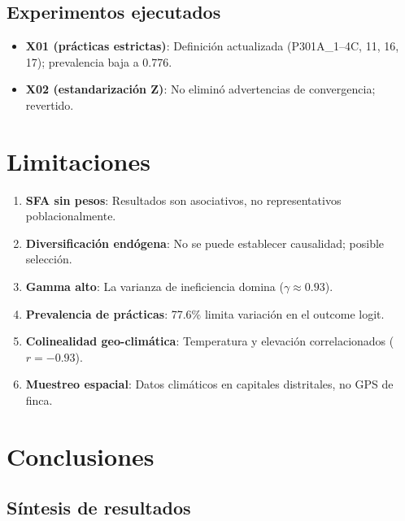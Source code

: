 \documentclass[11pt,a4paper]{article}
\begin{document}
\subsection{Experimentos ejecutados}
\begin{itemize}
    \item \textbf{X01 (prácticas estrictas)}: Definición actualizada (P301A\_1--4C, 11, 16, 17); prevalencia baja a 0.776.
    \item \textbf{X02 (estandarización Z)}: No eliminó advertencias de convergencia; revertido.
\end{itemize}

\section{Limitaciones}

\begin{enumerate}
    \item \textbf{SFA sin pesos}: Resultados son asociativos, no representativos poblacionalmente.
    \item \textbf{Diversificación endógena}: No se puede establecer causalidad; posible selección.
    \item \textbf{Gamma alto}: La varianza de ineficiencia domina ($\gamma \approx 0.93$).
    \item \textbf{Prevalencia de prácticas}: 77.6\% limita variación en el outcome logit.
    \item \textbf{Colinealidad geo-climática}: Temperatura y elevación correlacionados ($r = -0.93$).
    \item \textbf{Muestreo espacial}: Datos climáticos en capitales distritales, no GPS de finca.
\end{enumerate}

\section{Conclusiones}

\subsection{Síntesis de resultados}
\end{document}
